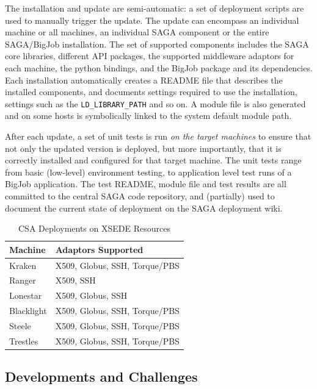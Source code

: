 \documentclass{sig-alternate}
\begin{document}
The installation and update are semi-automatic: a set of deployment
scripts are used to manually trigger the update. The update can encompass an
individual machine or all machines, an individual SAGA component or the entire
SAGA/BigJob installation. The set of supported components includes the SAGA core
libraries, different API packages, the supported
middleware adaptors for each machine, the python bindings, and the
BigJob package and its dependencies. Each installation automatically creates a
README file that describes the installed components, and documents settings
required to use the installation, settings such as the
\texttt{LD\_LIBRARY\_PATH} and so on. A module file is also generated and on
some hosts is symbolically linked to the system default module path. 

After each update, a set of unit tests is run \textit{on the
target machines} to ensure that not only the updated version is deployed, but
more importantly, that it is correctly installed and
configured for that target machine. The unit tests range from basic
(low-level) environment testing, to application level test runs of a
BigJob application. The test README, module file and test results
are all committed to the central SAGA code repository, and
(partially) used to document the current state of deployment on the
SAGA deployment wiki.

\begin{table}
\begin{center}
\begin{tabular}{ll}
\toprule
\textbf{Machine}  & 
\textbf{Adaptors Supported} 
\\ \midrule
Kraken   & 
X509, Globus, SSH, Torque/PBS
\\ \midrule
Ranger   & 
X509, SSH
\\ \midrule
Lonestar & 
X509, Globus, SSH
\\ \midrule
Blacklight & 
X509, Globus, SSH, Torque/PBS
\\ \midrule
Steele & 
X509, Globus, SSH, Torque/PBS
\\ \midrule
Trestles & 
X509, Globus, SSH, Torque/PBS
\\ \bottomrule
\end{tabular}
\caption{CSA Deployments on XSEDE Resources}
\label{table:CSA-Deployments}
\end{center}
\end{table}

\subsection{Developments and Challenges}
\end{document}
